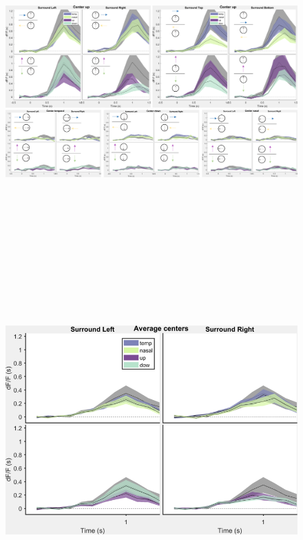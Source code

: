 \begin{figure}[H] \centering \includegraphics[width=14cm,height=12.5cm,keepaspectratio]{Figures/7.Results/individualSM/roi 29 mf379 pos5/surroundresponses.png} 
\end{figure}

\begin{figure}[H] \centering \includegraphics[width=12.5cm,height=12.5cm,keepaspectratio]{Figures/7.Results/individualSM/roi 29 mf379 pos5/averagecenters.png} 
\end{figure}

